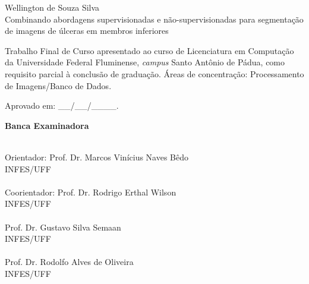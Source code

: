 \newpage
\vspace{1.5cm}

\begin{center}
    \large{Wellington de Souza Silva}\\
    \vspace{1.5cm}
    {\Large{Combinando abordagens supervisionadas e não-supervisionadas para segmentação de imagens de úlceras em membros inferiores}}
\end{center}

\vspace{1cm}
\begin{flushright}
    \begin{minipage}{15.6cm} 
        Trabalho Final de Curso apresentado ao curso de Licenciatura em Computação da Universidade Federal Fluminense, \textit{campus} Santo Antônio de Pádua, como requisito parcial à conclusão de graduação.
        Áreas de concentração: Processamento de Imagens/Banco de Dados.
    \end{minipage}
\end{flushright}

\begin{flushleft}
    \begin{minipage}{15.6cm}
        \hspace{0.3cm} Aprovado em: \_\_/\_\_/\_\_\_\_.
    \end{minipage}
\end{flushleft}
 
\begin{center}
    \Large \textbf{Banca Examinadora}
\end{center}

\vspace{1.5cm}

\begin{flushright}
    \begin{minipage}[l]{12cm}
        \begin{center}
            \uline{\hspace{10.5cm}} \\
            Orientador: Prof. Dr. Marcos Vinícius Naves Bêdo \\ INFES/UFF \\
            \vspace{1cm}
            \uline{\hspace{10.5cm}} \\
            Coorientador: Prof. Dr. Rodrigo Erthal Wilson \\ INFES/UFF \\
            \vspace{1cm}
            \uline{\hspace{10.5cm}} \\
            Prof. Dr. Gustavo Silva Semaan\\ INFES/UFF \\
            \vspace{1cm}
            \uline{\hspace{10.5cm}} \\
            Prof. Dr. Rodolfo Alves de Oliveira \\ INFES/UFF
        \end{center}
    \end{minipage}
\end{flushright}

